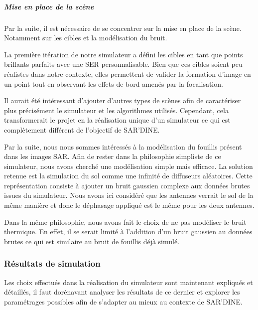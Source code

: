 \subparagraph{Mise en place de la scène}

Par la suite, il est nécessaire de se concentrer sur la mise en place de la scène. Notamment sur les cibles et la modélisation du bruit. 

La première itération de notre simulateur a défini les cibles en tant que points brillants parfaits avec une SER personnalisable. Bien que ces cibles soient peu réalistes dans notre contexte, elles permettent de valider la formation d'image en un point tout en observant les effets de bord amenés par la focalisation. 

Il aurait été intéressant d'ajouter d'autres types de scènes afin de caractériser plus précisément le simulateur et les algorithmes utilisés. Cependant, cela transformerait le projet en la réalisation unique d'un simulateur ce qui est complètement différent de l'objectif de SAR'DINE.

Par la suite, nous nous sommes intéressés à la modélisation du fouillis présent dans les images SAR. Afin de rester dans la philosophie simpliste de ce simulateur, nous avons cherché une modélisation simple mais efficace. La solution retenue est la simulation du sol comme une infinité de diffuseurs aléatoires. Cette représentation consiste à ajouter un bruit gaussien complexe aux données brutes issues du simulateur. Nous avons ici considéré que les antennes verrait le sol de la même manière et donc le déphasage appliqué est le même pour les deux antennes. 

Dans la même philosophie, nous avons fait le choix de ne pas modéliser le bruit thermique. En effet, il se serait limité à l'addition d'un bruit gaussien au données brutes ce qui est similaire au bruit de fouillis déjà simulé. 

\subsubsection{Résultats de simulation}\label{subsubsec:resultats_simu}

Les choix effectués dans la réalisation du simulateur sont maintenant expliqués et détaillés, il faut dorénavant analyser les résultats de ce dernier et explorer les paramétrages possibles afin de s'adapter au mieux au contexte de SAR'DINE.

